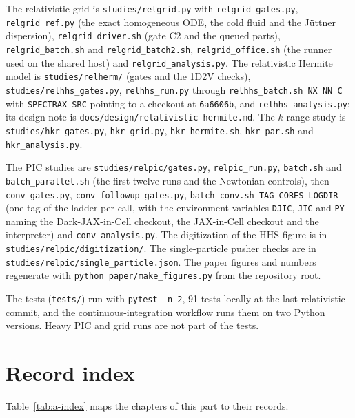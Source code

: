 The relativistic grid is \texttt{studies/relgrid.py} with \texttt{relgrid\_gates.py}, \texttt{relgrid\_ref.py} (the exact homogeneous ODE, the cold fluid and the J\"uttner dispersion), \texttt{relgrid\_driver.sh} (gate C2 and the queued parts), \texttt{relgrid\_batch.sh} and \texttt{relgrid\_batch2.sh}, \texttt{relgrid\_office.sh} (the runner used on the shared host) and \texttt{relgrid\_analysis.py}. The relativistic Hermite model is \texttt{studies/relherm/} (gates and the 1D2V checks), \texttt{studies/relhhs\_gates.py}, \texttt{relhhs\_run.py} through \texttt{relhhs\_batch.sh NX NN C} with \texttt{SPECTRAX\_SRC} pointing to a checkout at \texttt{6a6606b}, and \texttt{relhhs\_analysis.py}; its design note is \texttt{docs/design/relativistic-hermite.md}. The $k$-range study is \texttt{studies/hkr\_gates.py}, \texttt{hkr\_grid.py}, \texttt{hkr\_hermite.sh}, \texttt{hkr\_par.sh} and \texttt{hkr\_analysis.py}.

The PIC studies are \texttt{studies/relpic/gates.py}, \texttt{relpic\_run.py}, \texttt{batch.sh} and \texttt{batch\_parallel.sh} (the first twelve runs and the Newtonian controls), then \texttt{conv\_gates.py}, \texttt{conv\_followup\_gates.py}, \texttt{batch\_conv.sh TAG CORES LOGDIR} (one tag of the ladder per call, with the environment variables \texttt{DJIC}, \texttt{JIC} and \texttt{PY} naming the Dark-JAX-in-Cell checkout, the JAX-in-Cell checkout and the interpreter) and \texttt{conv\_analysis.py}. The digitization of the HHS figure is in \texttt{studies/relpic/digitization/}. The single-particle pusher checks are in \texttt{studies/relpic/single\_particle.json}. The paper figures and numbers regenerate with \texttt{python paper/make\_figures.py} from the repository root.

The tests (\texttt{tests/}) run with \texttt{pytest -n 2}, 91 tests locally at the last relativistic commit, and the continuous-integration workflow runs them on two Python versions. Heavy PIC and grid runs are not part of the tests.

\section{Record index}

Table~\ref{tab:a-index} maps the chapters of this part to their records.

